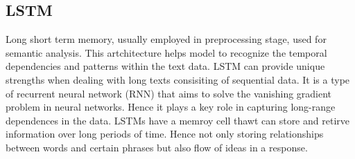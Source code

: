 \documentclass{article}
\begin{document}
\subsection{LSTM}
Long short term memory, usually employed in preprocessing stage, used for semantic analysis. This artchitecture helps model to recognize the temporal dependencies and patterns within the text data. LSTM can provide unique strengths when dealing with long texts consisiting of sequential data. It is a type of recurrent neural network (RNN) that aims to solve the vanishing gradient problem in neural networks. Hence it plays a key role in capturing long-range dependences in the data. LSTMs have a memroy cell thawt can store and retirve information over long periods of time. Hence not only storing relationships between words and certain phrases but also flow of ideas in a response. \\
\end{document}
